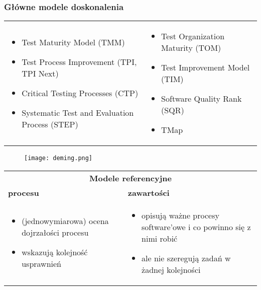 \documentclass[../main.tex]{subfiles}
\begin{document}
    \subsubsection{Główne modele doskonalenia}
    \begin{table}[H]
        \begin{center}
            \begin{tabular}{p{8cm} p{8cm}}
                \begin{itemize}
                    \item Test Maturity Model (TMM)
                    \item Test Process Improvement (TPI, TPI Next)
                    \item Critical Testing Processes (CTP)
                    \item Systematic Test and Evaluation Process (STEP)
                \end{itemize}
                &
                \begin{itemize}
                    \item Test Organization Maturity (TOM)
                    \item Test Improvement Model (TIM)
                    \item Software Quality Rank (SQR)
                    \item TMap
                \end{itemize}
            \end{tabular}
        \end{center}
    \end{table}


    \begin{figure}[H]
        \texttt{[image: deming.png]}
    \end{figure}

    \begin{table}[H]
        \begin{center}
            \begin{tabular}{| p{8cm} | p{8cm} |}
                \hline
                \multicolumn{2}{|c|}{\textbf{Modele referencyjne}}\\
                \textbf{procesu} & \textbf{zawartości}\\
                \hline
                \begin{itemize}
                    \item (jednowymiarowa) ocena dojrzałości procesu
                    \item wskazują kolejność usprawnień
                \end{itemize}
                &
                \begin{itemize}
                    \item opisują ważne procesy software’owe i co powinno się z nimi robić
                    \item ale nie szeregują zadań w żadnej kolejności
                \end{itemize}\\
                \hline
            \end{tabular}
        \end{center}
    \end{table}
\end{document}
